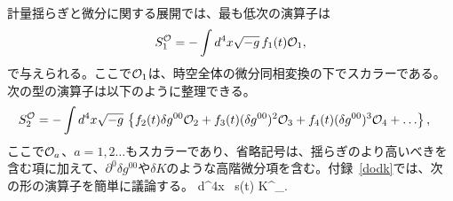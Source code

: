 \label{scaladof}

計量揺らぎと微分に関する展開では、最も低次の演算子は
\begin{equation}\label{inter1n}
S^{{\cal O}}_1=-\int d^4 x \sqrt{-g}\,   f_1(t){\cal O}_1,
\end{equation}
で与えられる。ここで${\cal O}_1$は、時空全体の微分同相変換の下でスカラーである。次の型の演算子は以下のように整理できる。
\begin{align}
S^{{\cal O}}_2&=-\int d^4 x \sqrt{-g}\, \left\{f_2(t)\delta g^{00} {\cal O}_2+ f_3(t)(\delta g^{00})^2 {\cal O}_3+ f_4(t)(\delta g^{00})^3 {\cal O}_4+\ldots\right\}, \label{inter2}
\end{align}
ここで${\cal O}_a$、$a=1,2\ldots$もスカラーであり、省略記号は、揺らぎのより高いべきを含む項に加えて、$\partial^0 \delta g^{00}$や$\delta K$のような高階微分項を含む。付録~\ref{dodk}では、次の形の演算子を簡単に議論する。\beq
\label{extcalotr}
\int d^4x ~s(t)  \hat\calo \delta K^\nu_\nu .
\eeq


